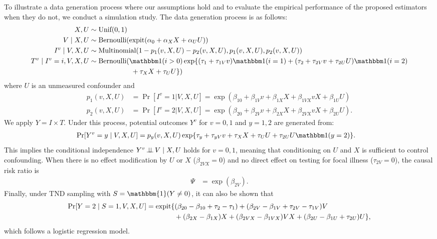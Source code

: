\documentclass[11pt]{article}
\begin{document}
To illustrate a data generation process where our assumptions hold and to evaluate the empirical performance of the proposed estimators when they do not, we conduct a simulation study. The data generation process is as follows:
\begin{align*}
    X, U &\sim \text{Unif}(0,1)\\
    V\mid X, U & \sim \text{Bernoulli}(\expit(\alpha_0 + \alpha_X X + \alpha_U U))\\
    I^v \mid V, X, U &\sim \text{Multinomial}(1-p_1(v, X, U) - p_2(v, X, U), p_1(v, X, U), p_2(v, X, U))\\
    T^v\mid I^v=i, V, X, U &\sim \text{Bernoulli}(\mathbbm 1(i>0)\exp\{(\tau_{1} + \tau_{1V}v) \mathbbm 1(i=1) + (\tau_{2} + \tau_{2V} v + \tau_{2U} U ) \mathbbm 1(i=2) \\&\qquad \qquad\qquad + \tau_X X + \tau_U U \})
\end{align*}
where $U$ is an unmeasured confounder and
\begin{align*}
    p_1(v, X, U) & = \Pr[I^v = 1 | V, X, U] = \exp(\beta_{10} + \beta_{1V}v + \beta_{1X}X + \beta_{1VX}vX + \beta_{1U}U) \\
    p_2(v, X, U) & = \Pr[I^v = 2 | V, X, U] = \exp(\beta_{20} + \beta_{2V}v + \beta_{2X}X + \beta_{2VX}vX + \beta_{2U}U).
\end{align*} We apply $Y = I \times T$. Under this process, potential outcomes $Y^v$ for $v=0,1$ and $y=1, 2$ are generated from:
\begin{align*}
    \Pr[Y^v = y\mid V, X, U] &= p_y(v, X, U)\exp\{\tau_y + \tau_{yV} v + \tau_X X + \tau_U U + \tau_{2U}U\mathbbm 1(y=2) \}.
\end{align*}
This implies the conditional independence $Y^v \operatorname{\perp\!\!\!\perp} V\mid X, U$ holds for $v=0,1$, meaning that conditioning on $U$ and $X$ is sufficient to control confounding. When there is no effect modification by $U$ or $X$ ($\beta_{2VX}=0$) and no direct effect on testing for focal illness ($\tau_{2V} = 0$), the causal risk ratio is
\begin{align*}
    \Psi &= \exp(\beta_{2V}).
\end{align*}
Finally, under TND sampling with $S=\mathbbm{1}(Y \neq 0)$, it can also be shown that
\begin{align*}
    \Pr[Y=2 \mid  S=1, V, X, U] &= \mathrm{expit}\{(\beta_{20}-\beta_{10}+\tau_2 - \tau_1) + (\beta_{2V} - \beta_{1V} + \tau_{2V} - \tau_{1V}) V\\ &\qquad\qquad+(\beta_{2X}-\beta_{1X})X+ (\beta_{2VX} - \beta_{1VX})VX + (\beta_{2U} - \beta_{1U} + \tau_{2U})U\},
\end{align*}
which follows a logistic regression model.
\end{document}
